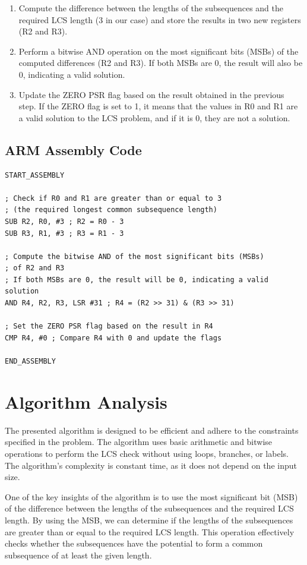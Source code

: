 \begin{enumerate}
    \item Compute the difference between the lengths of the subsequences and the required LCS length (3 in our case) and store the results in two new registers (R2 and R3).
    \item Perform a bitwise AND operation on the most significant bits (MSBs) of the computed differences (R2 and R3). If both MSBs are 0, the result will also be 0, indicating a valid solution.
    \item Update the ZERO PSR flag based on the result obtained in the previous step. If the ZERO flag is set to 1, it means that the values in R0 and R1 are a valid solution to the LCS problem, and if it is 0, they are not a solution.
\end{enumerate}

\subsection{ARM Assembly Code}

\begin{verbatim}
START_ASSEMBLY

; Check if R0 and R1 are greater than or equal to 3
; (the required longest common subsequence length)
SUB R2, R0, #3 ; R2 = R0 - 3
SUB R3, R1, #3 ; R3 = R1 - 3

; Compute the bitwise AND of the most significant bits (MSBs)
; of R2 and R3
; If both MSBs are 0, the result will be 0, indicating a valid solution
AND R4, R2, R3, LSR #31 ; R4 = (R2 >> 31) & (R3 >> 31)

; Set the ZERO PSR flag based on the result in R4
CMP R4, #0 ; Compare R4 with 0 and update the flags

END_ASSEMBLY
\end{verbatim}

\section{Algorithm Analysis}

The presented algorithm is designed to be efficient and adhere to the constraints specified in the problem. The algorithm uses basic arithmetic and bitwise operations to perform the LCS check without using loops, branches, or labels. The algorithm's complexity is constant time, as it does not depend on the input size.

One of the key insights of the algorithm is to use the most significant bit (MSB) of the difference between the lengths of the subsequences and the required LCS length. By using the MSB, we can determine if the lengths of the subsequences are greater than or equal to the required LCS length. This operation effectively checks whether the subsequences have the potential to form a common subsequence of at least the given length.

